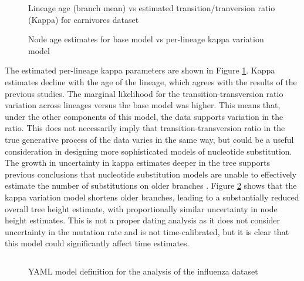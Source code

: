 \begin{figure}
    \centering
    \caption{Lineage age (branch mean) vs estimated transition/tranversion ratio (Kappa) for carnivores dataset}
    \label{fig:carnivoreskappa}
\end{figure}

\begin{figure}
    \centering
    \caption{Node age estimates for base model vs per-lineage kappa variation model}
    \label{fig:carnivorestree}
\end{figure}

The estimated per-lineage kappa parameters are shown in Figure \ref{fig:carnivoreskappa}. Kappa estimates decline with the age of the lineage, which agrees with the results of the previous studies. The marginal likelihood for the transition-transversion ratio variation across lineages versus the base model was higher. This means that, under the other components of this model, the data supports variation in the ratio. This does not necessarily imply that transition-transversion ratio in the true generative process of the data varies in the same way, but could be a useful consideration in designing more sophisticated models of nucleotide substitution. The growth in uncertainty in kappa estimates deeper in the tree supports previous conclusions that nucleotide substitution models are unable to effectively estimate the number of substitutions on older branches \cite{duchene2015declining}. Figure \ref{fig:carnivorestree} shows that the kappa variation model shortens older branches, leading to a substantially reduced overall tree height estimate, with proportionally similar uncertainty in node height estimates. This is not a proper dating analysis as it does not consider uncertainty in the mutation rate and is not time-calibrated, but it is clear that this model could significantly affect time estimates.

\begin{figure}

    \inputminted{yaml}{\VAR{ flu_yaml_file }}

    \label{fig:fluyaml}
    \caption{YAML model definition for the analysis of the influenza dataset}
\end{figure}


